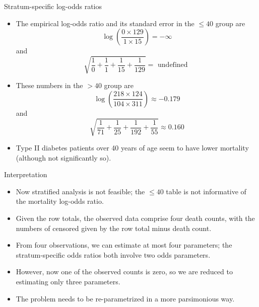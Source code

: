 \documentclass[10pt]{beamer}\usepackage[]{graphicx}\usepackage[]{color}
\begin{document}
\begin{frame}{Stratum-specific log-odds ratios}
	\begin{itemize}
		\item The empirical log-odds ratio and its standard error in the $\leq 40$ group are
		$$
		\log \left(\frac{0 \times 129}{1 \times 15}\right)=-\infty
		$$
		and
		$$
		\sqrt{\frac{1}{0}+\frac{1}{1}+\frac{1}{15}+\frac{1}{129}}=\text { undefined }
		$$
		\item  These numbers in the $>40$ group are
		$$
		\log \left(\frac{218 \times 124}{104 \times 311}\right) \approx-0.179
		$$
		and
		$$
		\sqrt{\frac{1}{71}+\frac{1}{25}+\frac{1}{192}+\frac{1}{55}} \approx 0.160
		$$
		\item Type II diabetes patients over 40 years of age seem to have lower mortality (although not significantly so).
	\end{itemize}
\end{frame}



\begin{frame}{Interpretation}
	\begin{itemize}
		\item Now stratified analysis is not feasible; the $\leq 40$ table is not informative of the mortality log-odds ratio.
		\item Given the row totals, the observed data comprise four death counts, with the numbers of censored given by the row total minus death count.
		\item From four observations, we can estimate at most four
		parameters; the stratum-specific odds ratios both involve two odds parameters.
		\item However, now one of the observed counts is zero, so we are reduced to estimating only three parameters.
		\item The problem needs to be re-parametrized in a more parsimonious way.
	\end{itemize}
\end{frame}
\end{document}
